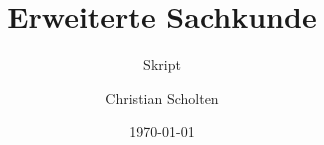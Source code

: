 \begin{titlepage}

\title{Erweiterte Sachkunde}
\subtitle{Skript}
\author{Christian Scholten}
\date{\today}

\end{titlepage}

\maketitle